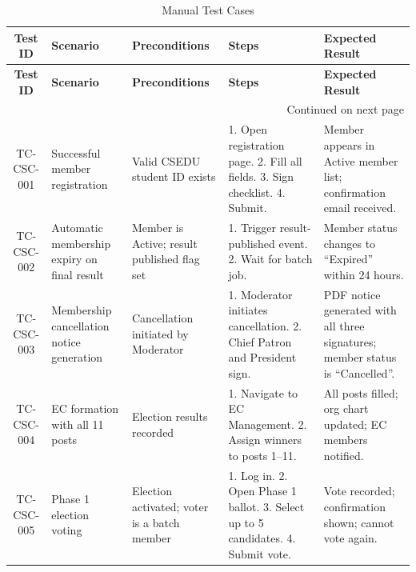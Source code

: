 \documentclass[12pt,a4paper]{article}
\begin{document}
\begin{center}
\small
\begin{longtable}{|c|p{3cm}|p{2.5cm}|p{3.5cm}|p{4cm}|}
\caption{Manual Test Cases} \label{tab:tc} \\

\hline
\rowcolor{DeepNavy}
\color{white}\textbf{Test ID} &
\color{white}\textbf{Scenario} &
\color{white}\textbf{Preconditions} &
\color{white}\textbf{Steps} &
\color{white}\textbf{Expected Result} \\
\hline
\endfirsthead

\hline
\rowcolor{DeepNavy}
\color{white}\textbf{Test ID} &
\color{white}\textbf{Scenario} &
\color{white}\textbf{Preconditions} &
\color{white}\textbf{Steps} &
\color{white}\textbf{Expected Result} \\
\hline
\endhead

\hline
\multicolumn{5}{r}{\small Continued on next page} \\
\hline
\endfoot

\hline
\endlastfoot

\rowcolor{LightTeal}
TC-CSC-001 & Successful member registration & Valid CSEDU student ID exists & 1. Open registration page. 2. Fill all fields. 3. Sign checklist. 4. Submit. & Member appears in Active member list; confirmation email received. \\ \hline

\rowcolor{LightBlue}
TC-CSC-002 & Automatic membership expiry on final result & Member is Active; result published flag set & 1. Trigger result-published event. 2. Wait for batch job. & Member status changes to ``Expired'' within 24 hours. \\ \hline

\rowcolor{LightTeal}
TC-CSC-003 & Membership cancellation notice generation & Cancellation initiated by Moderator & 1. Moderator initiates cancellation. 2. Chief Patron and President sign. & PDF notice generated with all three signatures; member status is ``Cancelled''. \\ \hline

\rowcolor{LightBlue}
TC-CSC-004 & EC formation with all 11 posts & Election results recorded & 1. Navigate to EC Management. 2. Assign winners to posts 1--11. & All posts filled; org chart updated; EC members notified. \\ \hline

\rowcolor{LightTeal}
TC-CSC-005 & Phase 1 election voting & Election activated; voter is a batch member & 1. Log in. 2. Open Phase 1 ballot. 3. Select up to 5 candidates. 4. Submit vote. & Vote recorded; confirmation shown; cannot vote again. \\ \hline


\end{longtable}
\end{center}
\end{document}
